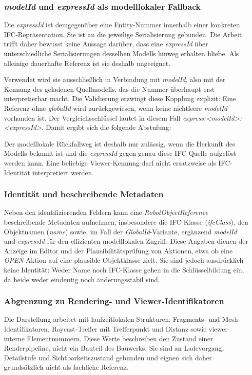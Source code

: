 \subsubsection{\textit{modelId} und \textit{expressId} als modelllokaler Fallback}
Die \textit{expressId} ist demgegenüber eine Entity-Nummer innerhalb einer konkreten
IFC-Repräsentation. Sie ist an die jeweilige Serialisierung gebunden. Die Arbeit trifft daher
bewusst keine Aussage darüber, dass eine \textit{expressId} über unterschiedliche Serialisierungen
desselben Modells hinweg erhalten bliebe. Als alleinige dauerhafte Referenz ist sie deshalb
ungeeignet.

Verwendet wird sie ausschließlich in Verbindung mit \textit{modelId}, also mit der Kennung des
geladenen Quellmodells, das die Nummer überhaupt erst interpretierbar macht. Die Validierung
erzwingt diese Kopplung explizit: Eine Referenz ohne \textit{globalId} wird zurückgewiesen, wenn
keine nichtleere \textit{modelId} vorhanden ist. Der Vergleichsschlüssel lautet in diesem Fall
\textit{express:<modelId>:<expressId>}. Damit ergibt sich die folgende Abstufung:

Der modelllokale Rückfallweg ist deshalb nur zulässig, wenn die Herkunft des Modells bekannt ist und
die \textit{expressId} gegen genau diese IFC-Quelle aufgelöst werden kann. Eine beliebige
Viewer-Kennung darf nicht ersatzweise als IFC-Identität interpretiert werden.

\subsubsection{Identität und beschreibende Metadaten}
Neben den identifizierenden Feldern kann eine \textit{RobotObjectReference} beschreibende Metadaten
aufnehmen, insbesondere die IFC-Klasse (\textit{ifcClass}), den Objektnamen (\textit{name}) sowie, 
im Fall der \textit{GlobalId}-Variante, ergänzend \textit{modelId} und \textit{expressId} für den
effizienten modelllokalen Zugriff. Diese Angaben dienen der Anzeige im Editor und der
Plausibilitätsprüfung von Aktionen, etwa ob eine \textit{OPEN}-Aktion auf eine plausible
Objektklasse zielt. Sie sind jedoch ausdrücklich keine Identität: Weder Name noch IFC-Klasse gehen
in die Schlüsselbildung ein, da beide weder eindeutig noch änderungsstabil sind.

\subsubsection{Abgrenzung zu Rendering- und Viewer-Identifikatoren}
Die Darstellung arbeitet mit laufzeitlokalen Strukturen: Fragments- und Mesh-Identifikatoren,
Raycast-Treffer mit Trefferpunkt und Distanz sowie viewer-interne Elementnummern. Diese Werte
beschreiben den Zustand einer Renderpipeline, nicht ein Bauteil des Bauwerks. Sie sind an
Ladevorgang, Detailstufe und Sichtbarkeitszustand gebunden und eignen sich daher grundsätzlich nicht
als fachliche Referenz.

